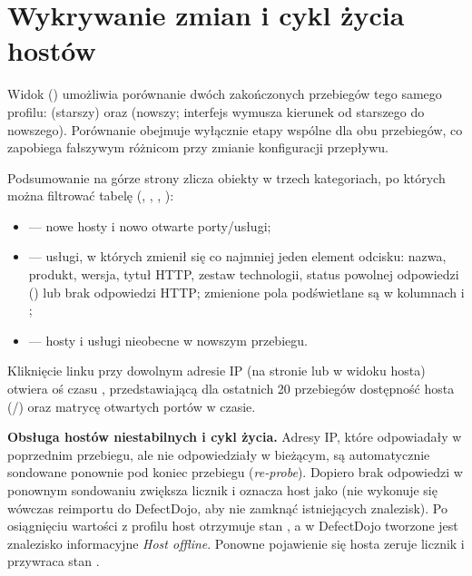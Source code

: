 \documentclass[10pt,a4paper]{article}
\begin{document}
\section{Wykrywanie zmian i cykl życia hostów}

Widok  () umożliwia porównanie dwóch zakończonych przebiegów tego samego profilu:  (starszy) oraz  (nowszy; interfejs wymusza kierunek od starszego do nowszego). Porównanie obejmuje wyłącznie etapy wspólne dla obu przebiegów, co zapobiega fałszywym różnicom przy zmianie konfiguracji przepływu.

Podsumowanie na górze strony zlicza obiekty w trzech kategoriach, po których można filtrować tabelę (, , , ):
\begin{itemize}
  \item {} --- nowe hosty i nowo otwarte porty/usługi;
  \item {} --- usługi, w których zmienił się co najmniej jeden element odcisku: nazwa, produkt, wersja, tytuł HTTP, zestaw technologii, status powolnej odpowiedzi () lub brak odpowiedzi HTTP; zmienione pola podświetlane są w kolumnach  i ;
  \item {} --- hosty i usługi nieobecne w nowszym przebiegu.
\end{itemize}

Kliknięcie linku  przy dowolnym adresie IP (na stronie  lub w widoku hosta) otwiera oś czasu , przedstawiającą dla ostatnich 20 przebiegów dostępność hosta (/) oraz matrycę otwartych portów w czasie.

\textbf{Obsługa hostów niestabilnych i cykl życia.} Adresy IP, które odpowiadały w poprzednim przebiegu, ale nie odpowiedziały w bieżącym, są automatycznie sondowane ponownie pod koniec przebiegu (\emph{re-probe}). Dopiero brak odpowiedzi w ponownym sondowaniu zwiększa licznik  i oznacza host jako  (nie wykonuje się wówczas reimportu do DefectDojo, aby nie zamknąć istniejących znalezisk). Po osiągnięciu wartości  z profilu host otrzymuje stan , a w DefectDojo tworzone jest znalezisko informacyjne \emph{Host offline}. Ponowne pojawienie się hosta zeruje licznik i przywraca stan .
\end{document}
